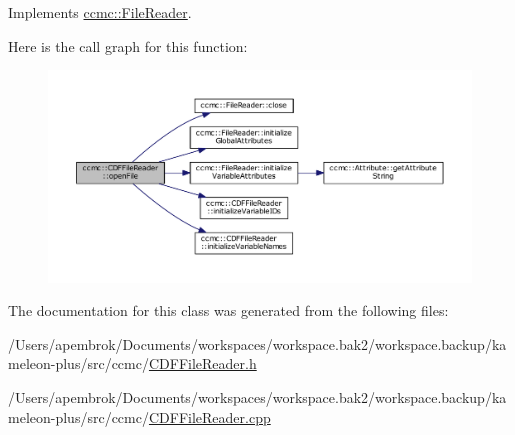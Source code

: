 Implements \hyperlink{classccmc_1_1_file_reader_ae4346cb5cf1c4861135d3f293d3da320}{ccmc\-::\-File\-Reader}.



Here is the call graph for this function\-:\nopagebreak
\begin{figure}[H]
\begin{center}
\leavevmode
\includegraphics[width=350pt]{classccmc_1_1_c_d_f_file_reader_a040e6e9a2c9f8e4aae6673fdc4a92cdb_cgraph}
\end{center}
\end{figure}




The documentation for this class was generated from the following files\-:\begin{DoxyCompactItemize}
\item 
/\-Users/apembrok/\-Documents/workspaces/workspace.\-bak2/workspace.\-backup/kameleon-\/plus/src/ccmc/\hyperlink{_c_d_f_file_reader_8h}{C\-D\-F\-File\-Reader.\-h}\item 
/\-Users/apembrok/\-Documents/workspaces/workspace.\-bak2/workspace.\-backup/kameleon-\/plus/src/ccmc/\hyperlink{_c_d_f_file_reader_8cpp}{C\-D\-F\-File\-Reader.\-cpp}\end{DoxyCompactItemize}

